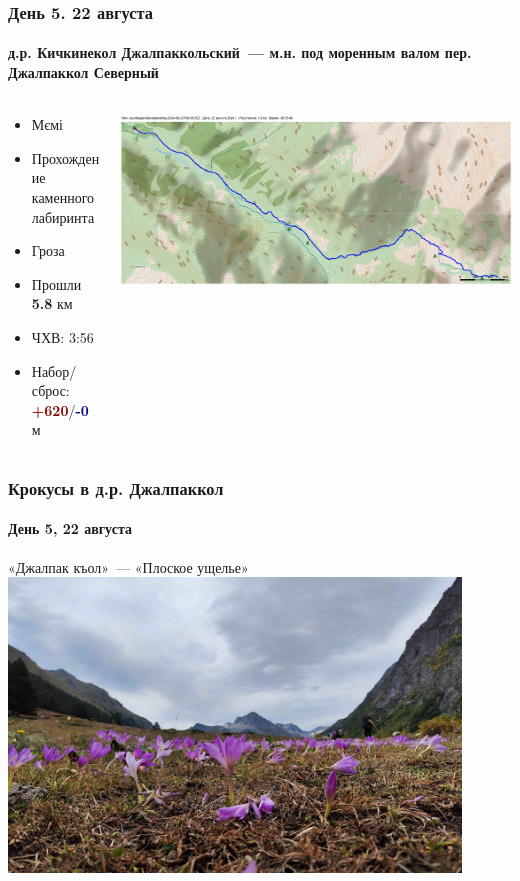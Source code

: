 	\begin{frame}
	\frametitle{День 5. 22 августа}
	\framesubtitle{д.р. Кичкинекол Джалпаккольский~--- м.н. под моренным валом пер. Джалпаккол Северный} %
	\begin{columns}[c] %
		\begin{column}{0.45\textwidth} %
			\begin{itemize}
				\item Мємі
				\item Прохождение каменного лабиринта
				\item Гроза
				\item Прошли \textbf{5.8} км
				\item ЧХВ: 3:56
				\item Набор/сброс: \textcolor{darkred}{\textbf{+620}}/\textcolor{darkblue}{\textbf{-0}}~м
			\end{itemize}
			
		\end{column}
		\begin{column}{0.5\textwidth} %
			\centering
			\includegraphics[width=\linewidth]{../pics/mini_maps/22}
		\end{column}
	\end{columns}
\end{frame}




\begin{frame}
	\frametitle{Крокусы в д.р. Джалпаккол}
	\framesubtitle{День 5, 22 августа}
	\footnotesize«Джалпак къол»~--- «Плоское ущелье»
	\centering
	\includegraphics[width=0.9\textwidth]{../pics/IMG_20240822_101449}			
\end{frame}

